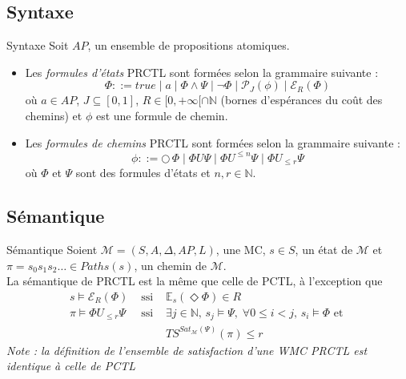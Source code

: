 \documentclass[compress]{beamer}
\begin{document}
\subsection{Syntaxe}
\begin{frame}{}
  \small
  \begin{block}{Syntaxe}
    Soit $AP$, un ensemble de propositions atomiques.
    \begin{itemize}
      \item Les \textit{\color{fibeamer@orange}formules d'états} PRCTL sont formées selon la
    grammaire suivante :
    \[
      \Phi ::= true \; | \; a \; | \; \Phi \wedge \Psi \; | \; \neg \Phi \; | \; \mathcal{P}_J(\phi) \; | \; \mathcal{E}_R (\Phi)
    \]
    où $a \in AP$, $J \subseteq [0, 1]$, $R \in [0, +\infty[ \cap \mathbb{N}$ (bornes d'espérances du coût des chemins) et $\phi$ est une formule de chemin.
      \item Les \textit{\color{fibeamer@orange}formules de chemins} PRCTL sont formées selon la grammaire suivante :
      \[
        \phi ::= \bigcirc\,\Phi \; | \; \Phi U \Psi \; | \; \Phi U^{\leq n} \Psi
        \; | \; \Phi U_{\leq r} \Psi
      \]
      où $\Phi$ et $\Psi$ sont des formules d'états et $n, r \in \mathbb{N}$.
    \end{itemize}
  \end{block}
\end{frame}

\subsection{Sémantique}
\begin{frame}{Sémantique}
\small
Soient $\mathcal{M} = (S, A, \Delta, AP, L)$, une MC, $s \in S$, un {\color{fibeamer@orange}état}
  de $\mathcal{M}$ et $\pi = s_0s_1s_2\dots \in Paths(s)$, un {\color{fibeamer@orange}chemin} de $\mathcal{M}$.\\
La sémantique de PRCTL est la même que celle de PCTL, à l'exception que
    \begin{align*}
      & s \models \mathcal{E}_R(\Phi) & \text{ ssi } & \mathbb{E}_s(\Diamond \Phi) \in R& \\
  &\pi \models \Phi U_{\leq r} \Psi &\text{ ssi }& \exists j \in \mathbb{N} ,\, s_j \models \Psi
    , \;  \forall 0 \leq i < j, \, s_i \models \Phi \text{ et }&\\
  & & & TS^{Sat_\mathcal{M}(\Psi)}(\pi) \leq r &
  \end{align*}
\textit{\color{gray}Note : la définition de l'ensemble de satisfaction d'une WMC PRCTL est identique à celle de PCTL}
\end{frame}
\end{document}
